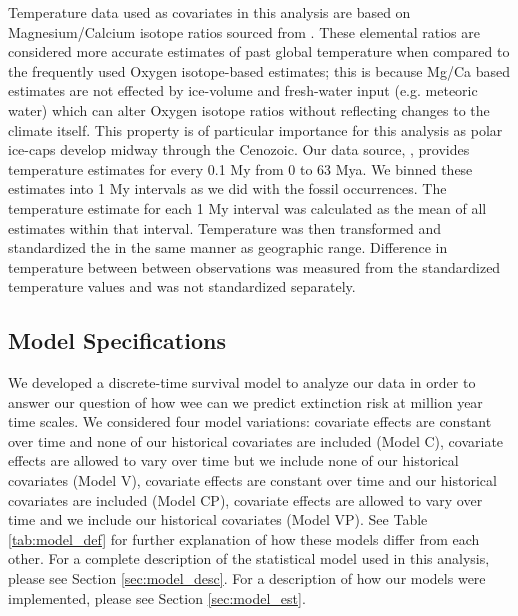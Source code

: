 \documentclass[12pt,letterpaper]{article}
\begin{document}
Temperature data used as covariates in this analysis are based on Magnesium/Calcium isotope ratios sourced from \citet{Cramer2011}. These elemental ratios are considered more accurate estimates of past global temperature when compared to the frequently used Oxygen isotope-based estimates; this is because Mg/Ca based estimates are not effected by ice-volume and fresh-water input (e.g. meteoric water) which can alter Oxygen isotope ratios without reflecting changes to the climate itself. This property is of particular importance for this analysis as polar ice-caps develop midway through the Cenozoic. Our data source, \citet{Cramer2011}, provides temperature estimates for every 0.1 My from 0 to 63 Mya. We binned these estimates into 1 My intervals as we did with the fossil occurrences. The temperature estimate for each 1 My interval was calculated as the mean of all estimates within that interval. Temperature was then transformed and standardized the in the same manner as geographic range. Difference in temperature between between observations was measured from the standardized temperature values and was not standardized separately.




\subsection{Model Specifications}

We developed a discrete-time survival model to analyze our data in order to answer our question of how wee can we predict extinction risk at million year time scales. We considered four model variations: covariate effects are constant over time and none of our historical covariates are included (Model C), covariate effects are allowed to vary over time but we include none of our historical covariates (Model V), covariate effects are constant over time and our historical covariates are included (Model CP), covariate effects are allowed to vary over time and we include our historical covariates (Model VP). See Table \ref{tab:model_def} for further explanation of how these models differ from each other. For a complete description of the statistical model used in this analysis, please see Section \ref{sec:model_desc}. For a description of how our models were implemented, please see Section \ref{sec:model_est}.
\end{document}
